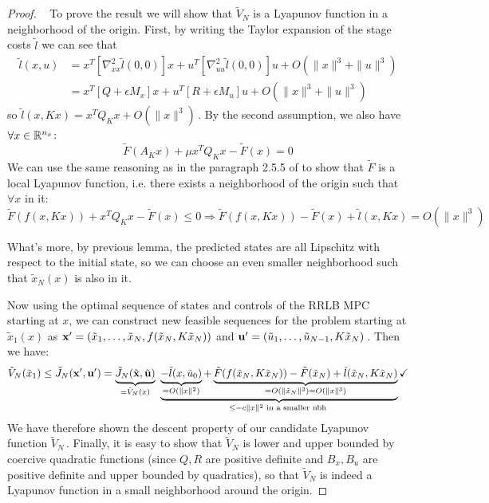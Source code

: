 \documentclass[12pt]{article}
\begin{document}
\begin{proof}~
	To prove the result we will show that $\tilde{V}_N$ is a Lyapunov function in a neighborhood of the origin.
	First, by writing the Taylor expansion of the stage costs $\tilde{l}$ we can see that
	\begin{align*}
		\tilde{l}(x,u)&=x^T[\nabla_{xx}^2\tilde{l}(0,0)] x+u^T[\nabla_{uu}^2\tilde{l}(0,0)]u+O(\|x\|^3+\|u\|^3)\\
		&=x^T[Q+\epsilon M_x]x+u^T[R+\epsilon M_u]u+O(\|x\|^3+\|u\|^3)
	\end{align*}
	so $\tilde{l}(x,Kx)=x^TQ_Kx+O(\|x\|^3)$\,.
	By the second assumption, we also have $\forall x\in\R^{n_x}$:
	$$\tilde{F}(A_Kx)+\mu x^T Q_K x-\tilde{F}(x)=0$$
	We can use the same reasoning as in the paragraph 2.5.5 of \cite{MPC-book} to show that $\tilde{F}$ is a local Lyapunov function, i.e. there exists a neighborhood of the origin such that $\forall x$ in it:
	$$\tilde{F}(f(x,Kx))+x^T Q_K x-\tilde{F}(x)\leq 0\Longrightarrow\tilde{F}(f(x,Kx))-\tilde{F}(x)+\tilde{l}(x,Kx)=O(\|x\|^3)$$

	\noindent What's more, by previous lemma, the predicted states are all Lipschitz with respect to the initial state, so we can choose an even smaller neighborhood such that $\tilde{x}_N(x)$ is also in it.

	\noindent Now using the optimal sequence of states and controls of the RRLB MPC starting at $x$, we can construct new feasible sequences for the problem starting at $\tilde{x}_1(x)$ as \newline
	$\bf{x}'=(\tilde{x}_1,\ldots,\tilde{x}_N,f(\tilde{x}_N,K\tilde{x}_N))$ and $\bf{u}'=(\tilde{u}_1,\ldots,\tilde{u}_{N-1},K\tilde{x}_N)$\,.
	Then we have:
	$$\tilde{V}_N(\tilde{x}_1)\leq\tilde{J}_N(\bf{x}',\bf{u}')=\underbrace{\tilde{J}_N(\tilde{\bf{x}},\tilde{\bf{u}})}_{=\tilde{V}_N(x)}~\underbrace{\underbrace{-\tilde{l}(x,\tilde{u}_0)}_{=O(\|x\|^2)}+\underbrace{\tilde{F}(f(\tilde{x}_N,K\tilde{x}_N))-\tilde{F}(\tilde{x}_N)+\tilde{l}(\tilde{x}_N,K\tilde{x}_N) }_{=O(\|\tilde{x}_N\|^3)=O(\|x\|^3)} }_{\leq-c\|x\|^2\text{ in a smaller nbh }}\checkmark$$
	We have therefore shown the descent property of our candidate Lyapunov function $\tilde{V}_N$\,.
	Finally, it is easy to show that $\tilde{V}_N$ is lower and upper bounded by coercive quadratic functions (since $Q,R$ are positive definite and $B_x,B_u$ are positive definite and upper bounded by quadratics), so that $\tilde{V}_N$ is indeed a Lyapunov function in a small neighborhood around the origin.
\end{proof}
\end{document}
